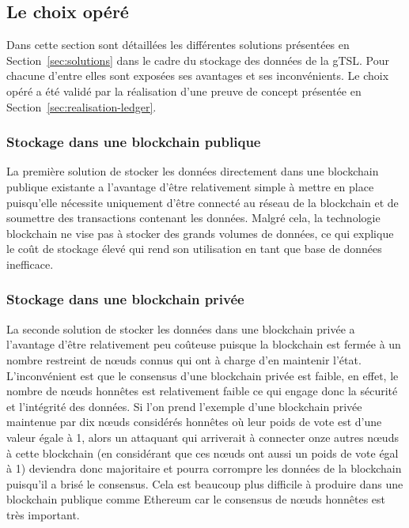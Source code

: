 \documentclass{tnreport}
\begin{document}
\subsection{Le choix opéré}

Dans cette section sont détaillées les différentes solutions présentées en Section~\ref{sec:solutions} dans le cadre du stockage des données de la gTSL. Pour chacune d'entre elles sont exposées ses avantages et ses inconvénients.
Le choix opéré a été validé par la réalisation d'une preuve de concept présentée en Section~\ref{sec:realisation-ledger}.

\subsubsection{Stockage dans une blockchain publique}

La première solution de stocker les données directement dans une blockchain publique existante a l'avantage d'être relativement simple à mettre en place puisqu'elle nécessite uniquement d'être connecté au réseau de la blockchain et de soumettre des transactions contenant les données. Malgré cela, la technologie blockchain ne vise pas à stocker des grands volumes de données, ce qui explique le coût de stockage élevé qui rend son utilisation en tant que base de données inefficace.

\subsubsection{Stockage dans une blockchain privée}

La seconde solution de stocker les données dans une blockchain privée a l'avantage d'être relativement peu coûteuse puisque la blockchain est fermée à un nombre restreint de nœuds connus qui ont à charge d'en maintenir l'état. L'inconvénient est que le consensus d'une blockchain privée est faible, en effet, le nombre de nœuds honnêtes est relativement faible ce qui engage donc la sécurité et l'intégrité des données. Si l'on prend l'exemple d'une blockchain privée maintenue par dix nœuds considérés honnêtes où leur poids de vote est d'une valeur égale à 1, alors un attaquant qui arriverait à connecter onze autres nœuds à cette blockchain (en considérant que ces nœuds ont aussi un poids de vote égal à 1) deviendra donc majoritaire et pourra corrompre les données de la blockchain puisqu'il a brisé le consensus. Cela est beaucoup plus difficile à produire dans une blockchain publique comme Ethereum car le consensus de nœuds honnêtes est très important.
\end{document}
